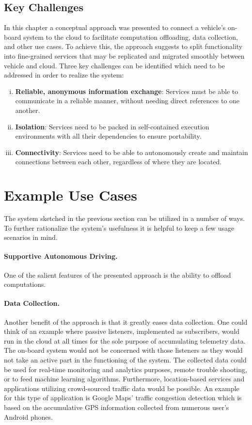 \subsection{Key Challenges}

In this chapter a conceptual approach was presented to connect a vehicle's on-board system to the cloud to facilitate computation offloading, data collection, and other use cases. To achieve this, the approach suggests to split functionality into fine-grained services that may be replicated and migrated smoothly between vehicle and cloud. Three key challenges can be identified which need to be addressed in order to realize the system:

\begin{enumerate}[(i)]
\item \textbf{Reliable, anonymous information exchange}: Services must be able to communicate in a reliable manner, without needing direct references to one another.
\item \textbf{Isolation}: Services need to be packed in self-contained execution environments with all their dependencies to ensure portability.
\item \textbf{Connectivity}: Services need to be able to autonomously create and maintain connections between each other, regardless of where they are located.
\end{enumerate}

%
%
%
%
%
%
%
%
%
%

\section{Example Use Cases} \label{sec:usecases}
The system sketched in the previous section can be utilized in a number of ways. To further rationalize the system's usefulness it is helpful to keep a few usage scenarios in mind.

\paragraph{Supportive Autonomous Driving.}
One of the salient features of the presented approach is the ability to offload computations. 

\paragraph{Data Collection.} 
Another benefit of the approach is that it greatly eases data collection. One could think of an example where passive listeners, implemented as subscribers, would run in the cloud at all times for the sole purpose of accumulating telemetry data. The on-board system would not be concerned with those listeners as they would not take an active part in the functioning of the system. The collected data could be used for real-time monitoring and analytics purposes, remote trouble shooting, or to feed machine learning algorithms. Furthermore, location-based services and applications utilizing crowd-sourced traffic data would be possible. An example for this type of application is Google Maps' traffic congestion detection which is based on the accumulative GPS information collected from numerous user's Android phones.

